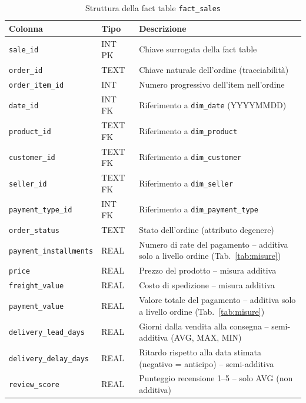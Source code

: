 \documentclass[12pt,a4paper]{article}
\begin{document}
\begin{table}[H]
  \centering
  \caption{Struttura della fact table \texttt{fact\_sales}}
  \label{tab:fact}
  \begin{tabular}{lll}
    \toprule
    \textbf{Colonna} & \textbf{Tipo} & \textbf{Descrizione} \\
    \midrule
    \texttt{sale\_id}             & INT PK   & Chiave surrogata della fact table \\
    \texttt{order\_id}            & TEXT     & Chiave naturale dell'ordine (tracciabilità) \\
    \texttt{order\_item\_id}      & INT      & Numero progressivo dell'item nell'ordine \\
    \texttt{date\_id}             & INT FK   & Riferimento a \texttt{dim\_date} (YYYYMMDD) \\
    \texttt{product\_id}          & TEXT FK  & Riferimento a \texttt{dim\_product} \\
    \texttt{customer\_id}         & TEXT FK  & Riferimento a \texttt{dim\_customer} \\
    \texttt{seller\_id}           & TEXT FK  & Riferimento a \texttt{dim\_seller} \\
    \texttt{payment\_type\_id}    & INT FK   & Riferimento a \texttt{dim\_payment\_type} \\
    \texttt{order\_status}        & TEXT     & Stato dell'ordine (attributo degenere) \\
    \texttt{payment\_installments} & REAL    & Numero di rate del pagamento -- additiva solo a livello ordine (Tab.~\ref{tab:misure}) \\
    \texttt{price}                & REAL     & Prezzo del prodotto -- misura additiva \\
    \texttt{freight\_value}       & REAL     & Costo di spedizione -- misura additiva \\
    \texttt{payment\_value}       & REAL     & Valore totale del pagamento -- additiva solo a livello ordine (Tab.~\ref{tab:misure}) \\
    \texttt{delivery\_lead\_days} & REAL     & Giorni dalla vendita alla consegna -- semi-additiva (AVG, MAX, MIN) \\
    \texttt{delivery\_delay\_days} & REAL    & Ritardo rispetto alla data stimata (negativo = anticipo) -- semi-additiva \\
    \texttt{review\_score}        & REAL     & Punteggio recensione 1--5 -- solo AVG (non additiva) \\
    \bottomrule
  \end{tabular}
\end{table}
\end{document}

